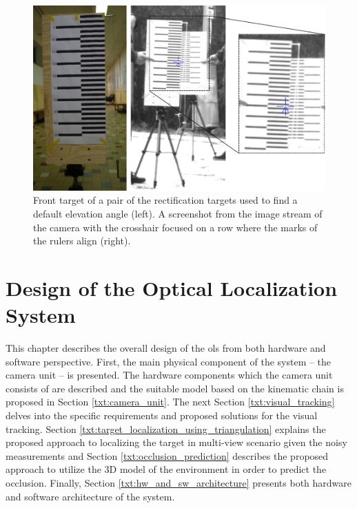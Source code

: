 \begin{figure}[htb]
	\centering
	\includegraphics[width=13cm]{fig/rect_default_elevation_angle.pdf}
	\caption{Front target of a pair of the rectification targets used to find a default elevation angle (left). A screenshot from the image stream of the camera with the crosshair focused on a row where the marks of the rulers align (right).}
	\label{fig:rect_default_elevation_angle}
\end{figure}


\chapter{Design of the Optical Localization System} \label{txt:design_of_the_OLS}

This chapter describes the overall design of the \gls{ols} from both hardware and software perspective. First, the main physical component of the system -- the camera unit -- is presented. The hardware components which the camera unit consists of are described and the suitable model based on the kinematic chain is proposed in Section \ref{txt:camera_unit}. The next Section \ref{txt:visual_tracking} delves into the specific requirements and proposed solutions for the visual tracking. Section \ref{txt:target_localization_using_triangulation} explains the proposed approach to localizing the target in multi-view scenario given the noisy measurements and Section \ref{txt:occlusion_prediction} describes the proposed approach to utilize the 3D model of the environment in order to predict the occlusion. Finally, Section \ref{txt:hw_and_sw_architecture} presents both hardware and software architecture of the system.

